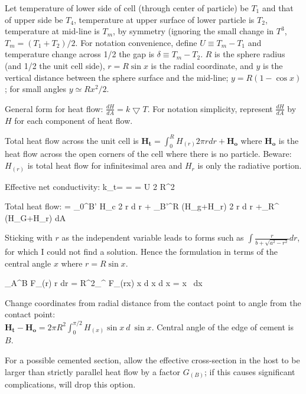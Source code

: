 \documentclass{article}
\begin{document}

Let temperature of lower side of cell (through center of particle) be $T_1$ and
that of upper side be $T_4$, temperature at upper surface of lower particle is
$T_2$, temperature at mid-line is $T_m$, by symmetry (ignoring the small change
in $T^3$, $T_m=(T_1+T_2)/2$. For notation convenience, define $U \equiv T_m-T_1$
and temperature change across 1/2 the gap is $\delta \equiv T_m-T_2$.  $R$ is
the sphere radius (and 1/2 the unit cell side), $r=R \sin x$ is the radial
coordinate, and $y$ is the vertical distance between the sphere surface and the
mid-line; $ y=R(1-\cos x)$; for small angles $y\simeq R x^2/2 $.

General form for heat flow: $\frac{dH}{dA} = k \bigtriangledown T $.  For
notation simplicity, represent $\frac{dH}{dA}$ by $H$ for each component of heat
flow.

Total heat flow across the unit cell is $ \mathbf{H_t}=\int_0^R H_{(r)} 2 \pi r
dr + \mathbf{H_o} $ where $ \mathbf{H_o}$ is the heat flow across the open
corners of the cell where there is no particle. Beware: $H_{(r)}$ is total heat
flow for infinitesimal area and $H_r$ is only the radiative portion.

Effective net conductivity:
\qbn k_t= =  =   {U 2 \pi R^2} \cdot {} \qen

Total heat flow:
 \qbn {}= \int_0^{B'} H_c 2 \pi r  d r + \int_{B'}^R (H_g+H_r) 2 \pi r  d r  +\int_R^  (H_G+H_r) dA \qen

Sticking with $r$ as the independent variable leads to forms such as $\int \frac{r}{b+\sqrt{a^2-r^2}} dr$, for which I could not find a solution. Hence the formulation in terms of the central angle $x$ where $r=R \sin x $.

\qb \int_A^B F_{(r)} r dr = R^2\int_{\arcsin {}}^{\arcsin {}} F_{(r\rightarrow x)}  \sin x d \sin x    d \sin x = \cos x \ dx \qe

Change coordinates from radial distance from the contact point to angle 
from the contact point:
\\ $ \mathbf{H_t-H_o}= 2 \pi R^2 \int_0^{\pi/2} H_{(x)} \sin x \ d \ \sin x $.
Central angle of the edge of cement is $B$.
 
For a possible cemented section, allow the effective cross-section in the host to be larger than strictly parallel heat flow by a factor $G_{(B)}$; if this causes significant complications, will drop this option.
\end{document}

